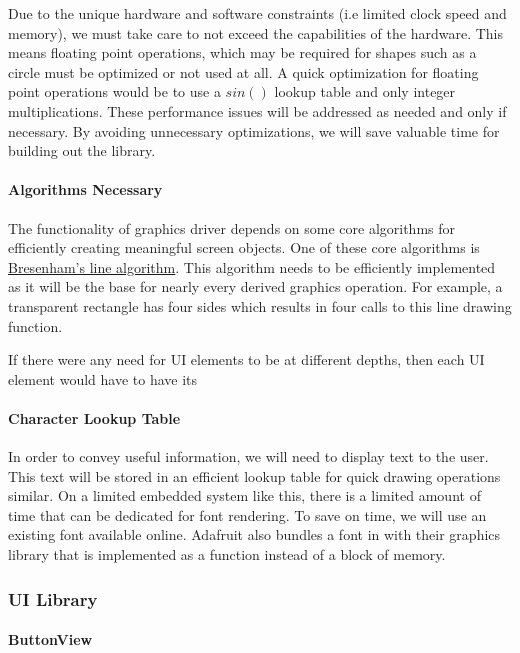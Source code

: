 Due to the unique hardware and software constraints (i.e limited clock speed
and memory), we must take care to not exceed the capabilities of the hardware.
This means floating point operations, which may be required for shapes such as
a circle must be optimized or not used at all. A quick optimization for
floating point operations would be to use a $sin()$ lookup table and only
integer multiplications. These performance issues will be addressed as needed
and only if necessary. By avoiding unnecessary optimizations, we will save
valuable time for building out the library.

\paragraph{Algorithms Necessary}
The functionality of graphics driver depends on some core algorithms for
efficiently creating meaningful screen objects. One of these core algorithms is
\href{https://en.wikipedia.org/wiki/Bresenham\%27s_line_algorithm}{Bresenham's
line algorithm}. This algorithm needs to be efficiently implemented as it will
be the base for nearly every derived graphics operation. For example, a
transparent rectangle has four sides which results in four calls to this line
drawing function.

If there were any need for UI elements to be at different depths, then each UI
element would have to have its

\paragraph{Character Lookup Table}
In order to convey useful information, we will need to display text to the
user. This text will be stored in an efficient lookup table for quick drawing
operations similar. On a limited embedded
system like this, there is a limited amount of time that can be dedicated for
font rendering. To save on time, we will use an existing font available online.
Adafruit also bundles a font in with their graphics library that is implemented
as a function instead of a block of memory.

\subsubsection{UI Library}
\label{sec:ui-lib}

\paragraph{ButtonView}
